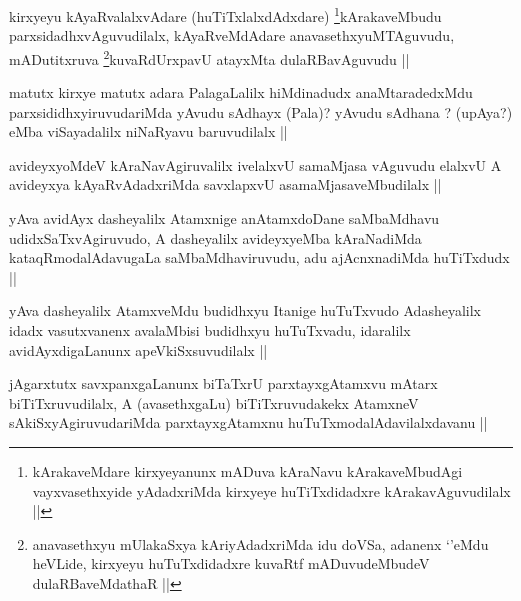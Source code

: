 
\begin{artha}
kirxyeyu kAyaRvalalxvAdare (huTiTxlalxdAdxdare) \footnote{kArakaveMdare kirxyeyanunx mADuva kAraNavu kArakaveMbudAgi vayxvasethxyide yAdadxriMda kirxyeye huTiTxdidadxre kArakavAguvudilalx ||}kArakaveMbudu parxsidadhxvAguvudilalx, kAyaRveMdAdare anavasethxyuMTAguvudu, mADutitxruva \footnote{anavasethxyu mUlakaSxya kAriyAdadxriMda idu doVSa, adanenx `\stext'eMdu heVLide, kirxyeyu huTuTxdidadxre kuvaRtf mADuvudeMbudeV dulaRBaveMdathaR ||}kuvaRdUrxpavU atayxMta dulaRBavAguvudu ||
\end{artha}

\begin{artha}
matutx kirxye matutx adara PalagaLalilx hiMdinadudx anaMtaradedxMdu parxsididhxyiruvudariMda yAvudu sAdhayx (Pala)? yAvudu sAdhana ? (upAya?) eMba viSayadalilx niNaRyavu baruvudilalx ||
\end{artha}


\begin{artha}
avideyxyoMdeV kAraNavAgiruvalilx ivelalxvU samaMjasa vAguvudu elalxvU A avideyxya kAyaRvAdadxriMda savxlapxvU asamaMjasaveMbudilalx ||
\end{artha}

\begin{artha}
yAva avidAyx dasheyalilx Atamxnige anAtamxdoDane saMbaMdhavu udidxSaTxvAgiruvudo, A dasheyalilx avideyxyeMba kAraNadiMda kataqRmodalAdavugaLa saMbaMdhaviruvudu, adu ajAcnxnadiMda huTiTxdudx ||
\end{artha}


\begin{artha}
yAva dasheyalilx AtamxveMdu budidhxyu Itanige huTuTxvudo Adasheyalilx idadx vasutxvanenx avalaMbisi budidhxyu huTuTxvadu, idaralilx avidAyxdigaLanunx apeVkiSxsuvudilalx ||
\end{artha}

\begin{artha}
jAgarxtutx savxpanxgaLanunx biTaTxrU parxtayxgAtamxvu mAtarx biTiTxruvudilalx, A (avasethxgaLu) biTiTxruvudakekx AtamxneV sAkiSxyAgiruvudariMda parxtayxgAtamxnu huTuTxmodalAdavilalxdavanu ||
\end{artha}

